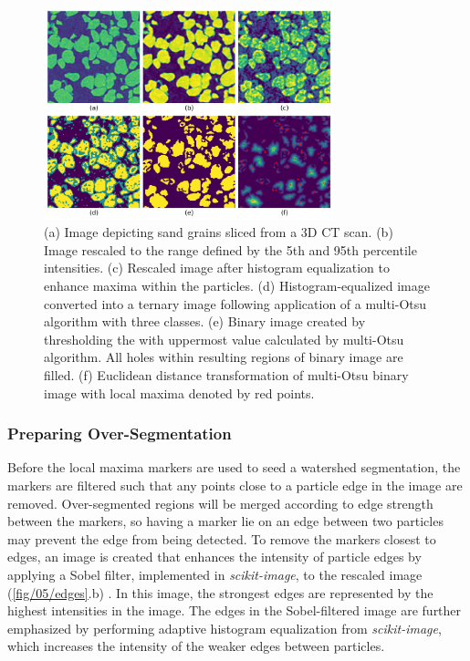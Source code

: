 \begin{figure}[ht]
    \centering
    \includegraphics[width=0.75\textwidth]{figures/05/03-routine.png}
    \caption{
        \small{}
        (a) Image depicting sand grains sliced from a 3D CT scan.
        (b) Image rescaled to the range defined by the 5th and 95th percentile
        intensities.
        (c) Rescaled image after histogram equalization to enhance
        maxima within the particles.
        (d) Histogram-equalized image converted into
        a ternary image following application of a multi-Otsu algorithm with
        three classes.
        (e) Binary image created by thresholding the with uppermost value
        calculated by multi-Otsu algorithm. All holes within resulting regions
        of binary image are filled.
        (f) Euclidean distance transformation of multi-Otsu binary image with
        local maxima denoted by red points.
    }
    \label{fig/05/routine}
\end{figure}

\subsubsection{Preparing Over-Segmentation}
Before the local maxima markers are used to seed a watershed segmentation,
the markers are filtered such that any points close to a particle edge
in the image are removed. Over-segmented regions will be merged according
to edge strength between the markers, so having a marker lie on
an edge between two particles may prevent the edge from being detected. To
remove the markers closest to edges, an image is created that enhances the
intensity of particle edges by applying a Sobel filter, implemented in
\textit{scikit-image}, to the rescaled image (\ref{fig/05/edges}.b)
\cite{Kanopoulos1988}. In this image, the
strongest edges are represented by the highest intensities in the image.
The edges in the Sobel-filtered image are further emphasized by performing
adaptive histogram equalization from \textit{scikit-image}, which increases
the intensity of the weaker edges between particles.

